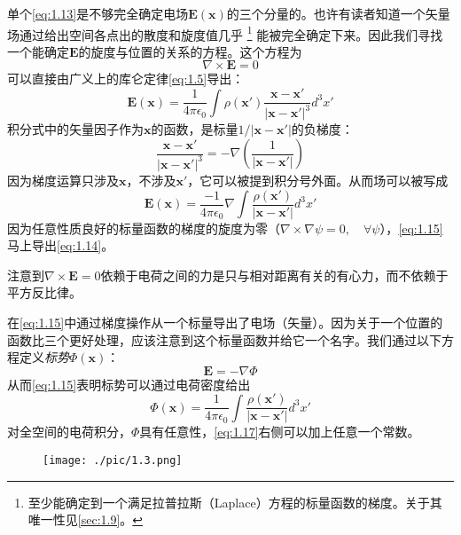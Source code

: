 \documentclass[12pt]{book}
\numberwithin{equation}{chapter}
\numberwithin{figure}{chapter}
\numberwithin{footnote}{page}
\begin{document}
单个\autoref{eq:1.13}是不够完全确定电场$\mathbf{E}(\mathbf{x})$的三个分量的。也许有读者知道一个矢量场通过给出空间各点出的散度和旋度值几乎
\footnote{至少能确定到一个满足拉普拉斯（Laplace）方程的标量函数的梯度。关于其唯一性见\autoref{sec:1.9}。}
能被完全确定下来。因此我们寻找一个能确定$\mathbf{E}$的旋度与位置的关系的方程。这个方程为
\begin{equation}\label{eq:1.14}
    \nabla\times\mathbf{E}=0
\end{equation}
可以直接由广义上的库仑定律\autoref{eq:1.5}导出：
$$\mathbf{E}(\mathbf{x})=\frac{1}{4\pi\epsilon_0}\int \rho(\mathbf{x'})\frac{\mathbf{x}-\mathbf{x'}}{|\mathbf{x}-\mathbf{x'}|^3}d^3 x'$$
积分式中的矢量因子作为$\mathbf{x}$的函数，是标量$1/|\mathbf{x}-\mathbf{x'}|$的负梯度：
$$\frac{\mathbf{x}-\mathbf{x'}}{|\mathbf{x}-\mathbf{x'}|^3}=-\nabla(\frac{1}{|\mathbf{x}-\mathbf{x'}|})$$
因为梯度运算只涉及$\mathbf{x}$，不涉及$\mathbf{x'}$，它可以被提到积分号外面。从而场可以被写成
\begin{equation}\label{eq:1.15}
    \mathbf{E}(\mathbf{x})=\frac{-1}{4\pi\epsilon_0}\nabla\int \frac{\rho(\mathbf{x'})}{|\mathbf{x}-\mathbf{x'}|}d^3x'
\end{equation}
因为任意性质良好的标量函数的梯度的旋度为零（$\nabla\times\nabla \psi=0,\quad \forall \psi$），\autoref{eq:1.15}马上导出\autoref{eq:1.14}。

注意到$\nabla\times\mathbf{E}=0$依赖于电荷之间的力是只与相对距离有关的有心力，而不依赖于平方反比律。

在\autoref{eq:1.15}中通过梯度操作从一个标量导出了电场（矢量）。因为关于一个位置的函数比三个更好处理，应该注意到这个标量函数并给它一个名字。我们通过以下方程定义\textit{标势}$\Phi(\mathbf{x})$：
\begin{equation}\label{eq:1.16}
    \mathbf{E}=-\nabla\Phi
\end{equation}
从而\autoref{eq:1.15}表明标势可以通过电荷密度给出
\begin{equation}\label{eq:1.17}
    \Phi(\mathbf{x})=\frac{1}{4\pi\epsilon_0}\int \frac{\rho(\mathbf{x'})}{|\mathbf{x}-\mathbf{x'}|}d^3x'
\end{equation}
对全空间的电荷积分，$\Phi$具有任意性，\autoref{eq:1.17}右侧可以加上任意一个常数。

\begin{figure}[!ht]
    \centering
    \texttt{[image: ./pic/1.3.png]}
    \captionsetup{justification=raggedright, singlelinecheck=false}
    \caption{}
    \label{fig:1.3}
\end{figure}
\end{document}
